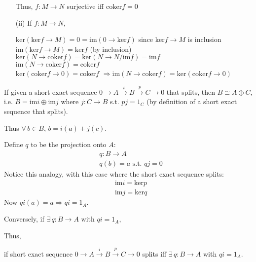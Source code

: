 \documentclass[twoside,landscape]{amsart}
\theoremstyle{plain}
\theoremstyle{definition}
\theoremstyle{remark}
\newcommand{\exercisehead}[1]
  { \smallskip
   \noindent{\small\bf Exercise #1.}
  }
\begin{document}
\begin{multicols*}{2}
\begin{enumerate}
Thus, $f:M\to N$ surjective iff $\text{coker}f=0$
\item[(ii)] If $f:M\to N$, 

$\text{ker}(\text{ker}f \to M) = 0 = \text{im}(0\to \text{ker}f)$ since $\text{ker}f \to M$ is inclusion \\
$\text{im}(\text{ker}f\to M) = \text{ker}f$ (by inclusion) \\
$\text{ker}(N\to \text{coker}f) = \text{ker}(N\to N/\text{im}f) = \text{im}f$ \\
$\text{im}(N\to \text{coker}f) = \text{coker}f$ \\
$\text{ker}(\text{coker}f\to 0)=\text{coker}f$ $\Longrightarrow \text{im}(N\to \text{coker}f) = \text{ker}(\text{coker}f \to 0)$
\end{enumerate}


\exercisehead{7.17} 

If given a short exact sequence $0 \to A \xrightarrow{i} B \xrightarrow{p} C \to 0$ that splits, then $B \cong A\oplus C$, i.e. $B = \text{im}i \oplus \text{im}j$ where $j:C\to B$ s.t. $pj=1_C$ (by definition of a short exact sequence that splits).  

Thus $\forall \, b \in B$, $b = i(a) + j(c)$.  

Define $q$ to be the projection onto $A$: 
\[
\begin{aligned}
  & q: B \to A \\ 
  & q(b) = a \text{ s.t. } qj =0
\end{aligned}
\]
Notice this analogy, with this case where the short exact sequence splits:
\[
\begin{aligned}
  & \text{im}i = \text{ker}p \\ 
  &  \text{im}j = \text{ker}q
\end{aligned}
\]
Now $qi(a) = a \Longrightarrow qi = 1_A$.  

Conversely, if $\exists \, q : B \to A$ with $qi = 1_A$, 



Thus,

if short exact sequence $0 \to A \xrightarrow{i} B \xrightarrow{p} C \to 0$ splits iff $\exists \, q:B \to A$ with $qi=1_A$.  




\end{multicols*}
\end{document}
